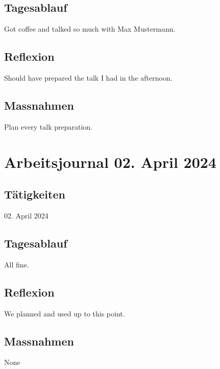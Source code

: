 	\subsection{Tagesablauf}
	Got coffee and talked so much with Max Mustermann.
	
	\subsection{Reflexion}
	Should have prepared the talk I had in the afternoon.
	
	\subsection{Massnahmen}
	Plan every talk preparation.

	\section{Arbeitsjournal 02. April 2024}
	
	\subsection{Tätigkeiten}

	\begin{timetable}{02. April 2024}
	\end{timetable}

	\subsection{Tagesablauf}
	All fine.
	
	\subsection{Reflexion}

	We planned \the\value{timetableoverallsolltotal} and used \the\value{timetableoverallisttotal} up to this point.
	
	\subsection{Massnahmen}
	None
	
